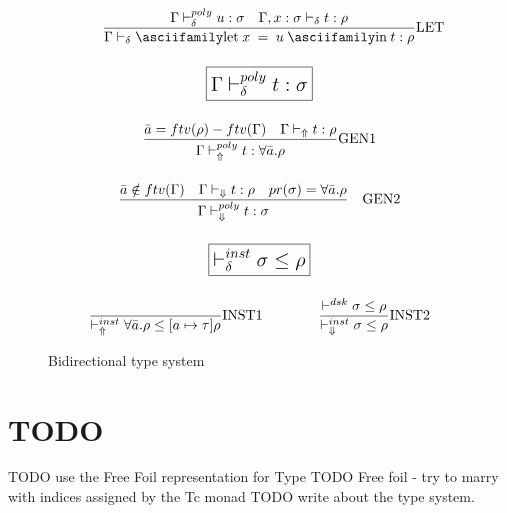 \begin{figure}[h]
\begin{tcolorbox}[breakable, colback=white]
\begin{gather*}
      \qquad
      \frac{\Gamma \Qquad \mexp{\vdash_\delta^{poly} u : \sigma} \quad \Gamma, \mexp{x:\sigma \vdash_\delta t : \rho}}{\Gamma \vdash_\delta \msyn{let} \Qquad \mexp{x} \Qquad = \Qquad \mexp{u} \Qquad \msyn{in} \Qquad \mexp{t : \rho}} \text{LET}
      \\[\bigskipamount]
      \boxed{\mlg{\Gamma \Qquad \mexp{\vdash_\delta^{poly} t : \sigma}}}
      \\[\bigskipamount]
      \frac{\mexp{\bar{a}} = \mexp{ftv}(\rho) - \mexp{ftv}(\Gamma) \quad \Gamma \Qquad \mexp{\vdash_\Uparrow t : \rho}}{\Gamma \Qquad \mexp{\vdash_\Uparrow^{poly} t : \forall \bar{a}.\rho}} \text{GEN1}
      \\[\bigskipamount]
      \frac{\mexp{\bar{a}} \notin \mexp{ftv}(\Gamma) \quad \Gamma \Qquad \mexp{\vdash_\Downarrow t : \rho \quad pr(\sigma) = \forall \bar{a}.\rho}}{\Gamma \Qquad \mexp{\vdash_\Downarrow^{poly} t : \sigma}} \quad \text{GEN2}
      \\[\bigskipamount]
      \boxed{\mlg{\mexp{\vdash_\delta^{inst} \sigma \leq \rho}}}
      \\[\bigskipamount]
      \frac{}{\mexp{\vdash_\Uparrow^{inst} \forall \bar{a}.\rho \leq [a \mapsto \tau] \rho}} \text{INST1}
      \qquad \qquad
      \frac{\mexp{\vdash^{dsk} \sigma \leq \rho}}{\mexp{\vdash_\Downarrow^{inst} \sigma \leq \rho}} \text{INST2}
    \end{gather*}
  \end{tcolorbox}
  \caption{Bidirectional type system}
  \label{fig:TypeSystem}
\end{figure}

\section{TODO}

TODO use the Free Foil representation for Type
TODO Free foil - try to marry with indices assigned by the Tc monad
TODO write about the type system.



